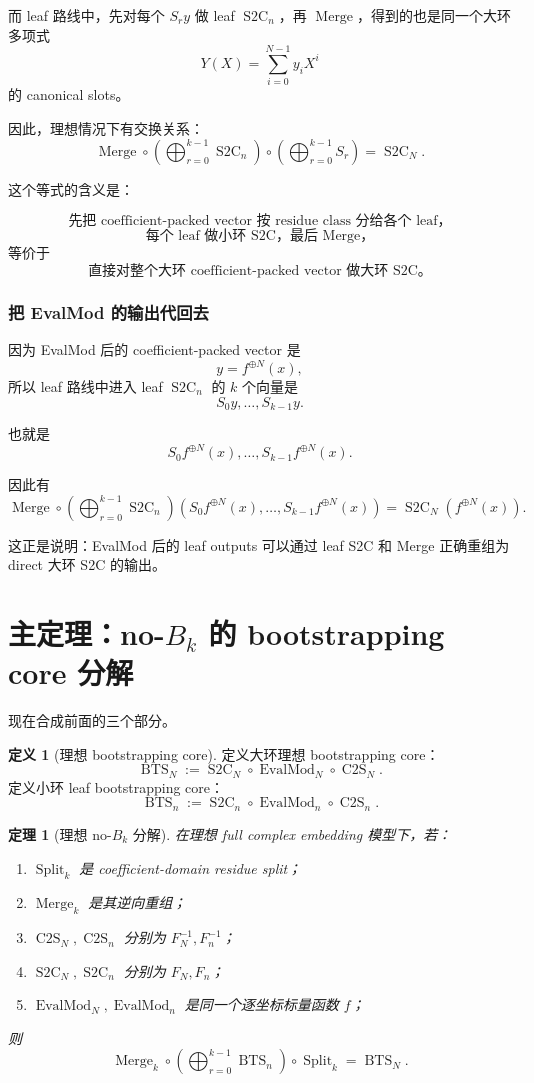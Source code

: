 \documentclass[UTF8,11pt]{ctexart}
\newtheorem{theorem}{定理}
\theoremstyle{definition}
\newtheorem{definition}{定义}
\newcommand{\CtwoS}{\operatorname{C2S}}
\newcommand{\StwoC}{\operatorname{S2C}}
\newcommand{\BTS}{\operatorname{BTS}}
\newcommand{\Split}{\operatorname{Split}}
\newcommand{\Merge}{\operatorname{Merge}}
\newcommand{\EvalMod}{\operatorname{EvalMod}}
\begin{document}
而 leaf 路线中，先对每个 \(S_ry\) 做 leaf \(\StwoC_n\)，再 \(\Merge\)，得到的也是同一个大环多项式
\[
Y(X)=\sum_{i=0}^{N-1}y_iX^i
\]
的 canonical slots。

因此，理想情况下有交换关系：
\[
\boxed{
\Merge
\circ
\left(
\bigoplus_{r=0}^{k-1}\StwoC_n
\right)
\circ
\left(
\bigoplus_{r=0}^{k-1}S_r
\right)
=
\StwoC_N.
}
\]

这个等式的含义是：

\[
\text{先把 coefficient-packed vector 按 residue class 分给各个 leaf，}
\]
\[
\text{每个 leaf 做小环 S2C，最后 Merge，}
\]
等价于
\[
\text{直接对整个大环 coefficient-packed vector 做大环 S2C。}
\]

\subsubsection*{把 EvalMod 的输出代回去}

因为 EvalMod 后的 coefficient-packed vector 是
\[
y=f^{\oplus N}(x),
\]
所以 leaf 路线中进入 leaf \(\StwoC_n\) 的 \(k\) 个向量是
\[
S_0y,\ldots,S_{k-1}y.
\]

也就是
\[
S_0 f^{\oplus N}(x),\ldots,S_{k-1} f^{\oplus N}(x).
\]

因此有
\[
\Merge
\circ
\left(
\bigoplus_{r=0}^{k-1}\StwoC_n
\right)
\left(
S_0 f^{\oplus N}(x),
\ldots,
S_{k-1} f^{\oplus N}(x)
\right)
=
\StwoC_N\left(f^{\oplus N}(x)\right).
\]

这正是说明：EvalMod 后的 leaf outputs 可以通过 leaf S2C 和 Merge 正确重组为 direct 大环 S2C 的输出。

\section{主定理：no-\(B_k\) 的 bootstrapping core 分解}

现在合成前面的三个部分。

\begin{definition}[理想 bootstrapping core]
定义大环理想 bootstrapping core：
\[
\BTS_N
:=
\StwoC_N\circ\EvalMod_N\circ\CtwoS_N.
\]
定义小环 leaf bootstrapping core：
\[
\BTS_n
:=
\StwoC_n\circ\EvalMod_n\circ\CtwoS_n.
\]
\end{definition}

\begin{theorem}[理想 no-\(B_k\) 分解]
在理想 full complex embedding 模型下，若：
\begin{enumerate}[label=(\arabic*)]
    \item \(\Split_k\) 是 coefficient-domain residue split；
    \item \(\Merge_k\) 是其逆向重组；
    \item \(\CtwoS_N,\CtwoS_n\) 分别为 \(F_N^{-1},F_n^{-1}\)；
    \item \(\StwoC_N,\StwoC_n\) 分别为 \(F_N,F_n\)；
    \item \(\EvalMod_N,\EvalMod_n\) 是同一个逐坐标标量函数 \(f\)；
\end{enumerate}
则
\[
\boxed{
\Merge_k
\circ
\left(
\bigoplus_{r=0}^{k-1}\BTS_n
\right)
\circ
\Split_k
=
\BTS_N.
}
\]
\end{theorem}
\end{document}
